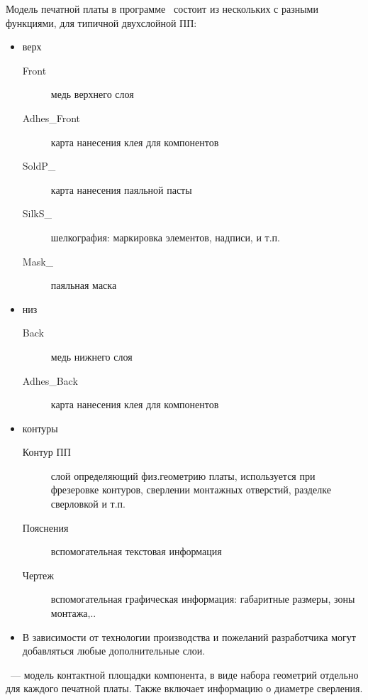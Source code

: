 
Модель печатной платы в программе \pcbnew\ состоит из нескольких
 с разными функциями, для типичной
двухслойной ПП:

\begin{itemize}
  \item верх
  \begin{description}
  \item[Front] медь верхнего слоя
  \item[Adhes\_Front] карта нанесения клея для компонентов
  \item[SoldP\_] карта нанесения паяльной пасты
  \item[SilkS\_] шелкография: маркировка элементов, надписи, и т.п.
  \item[Mask\_] паяльная маска 
  \end{description}
  \item низ
  \begin{description}
  \item[Back] медь нижнего слоя
  \item[Adhes\_Back] карта нанесения клея для компонентов 
  \end{description}
  \item контуры
  \begin{description}
  \item[Контур ПП] слой определяющий физ.геометрию платы, используется при
  фрезеровке контуров, сверлении монтажных отверстий, разделке сверловкой и т.п.
  \item[Пояснения] вспомогательная текстовая информация
  \item[Чертеж] вспомогательная графическая информация: габаритные размеры, зоны
  монтажа,..
  \end{description}

\item В зависимости от технологии производства и пожеланий разработчика могут
добавляться любые дополнительные слои.
\end{itemize}


\ --- модель контактной площадки компонента, в виде
набора геометрий отдельно для каждого  печатной платы. Также включает
информацию о диаметре сверления.

% 
% 
% 
% 
% 
% 
% 
% 

\secup
